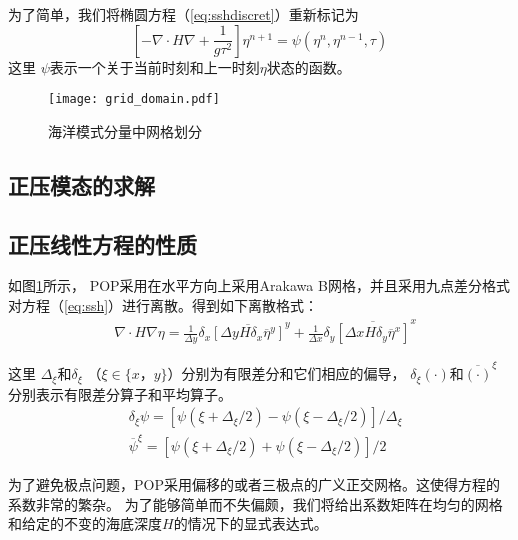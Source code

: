 为了简单，我们将椭圆方程（\ref{eq:sshdiscret}）重新标记为
\begin{equation}
\label{eq:ssh}
[-\nabla \cdot H\nabla +\frac{1}{g  \tau^2}]\eta^{n+1} = \psi(\eta^n,\eta^{n-1},\tau)
\end{equation}
这里 $\psi$表示一个关于当前时刻和上一时刻$\eta$状态的函数。
 

\begin{figure}%
\centering
\texttt{[image: grid\_domain.pdf]}
\caption[] {海洋模式分量中网格划分\label{fig:grid1}}
\end{figure}

\subsection{正压模态的求解}
\label{related:barosolver}
 

\subsection{正压线性方程的性质}
\label{related:baroproperty}

如图\ref{fig:grid1}所示， POP采用在水平方向上采用Arakawa B网格\cite{smith2010parallel}，并且采用九点差分格式对方程（\ref{eq:ssh}）进行离散。得到如下离散格式：
\begin{align}
    & \nabla\cdot H \nabla \eta  =\frac{1}{\Delta y}\delta_x \overline{[\Delta y H  \delta_x\overline{\eta}^y]}^y +\frac{1}{\Delta x}\delta_y \overline{[\Delta x H  \delta_y\overline{\eta}^x]}^x \label{eq:nabla2}
  \end{align}

这里 $\Delta_\xi$和$\delta_\xi$  （$\xi \in \{x， y\} $）分别为有限差分和它们相应的偏导，  $\delta_\xi (\cdot) $和$\overline{(\cdot)}^\xi $ 分别表示有限差分算子和平均算子。  
\begin{align}
&\delta_\xi \psi = [\psi (\xi+\Delta_\xi/2) -\psi(\xi-\Delta_\xi/2)]/\Delta_\xi \\
&\overline{\psi}^\xi  =[\psi (\xi+\Delta_\xi/2) +\psi(\xi-\Delta_\xi/2)]/2
\end{align}


为了避免极点问题，POP采用偏移的或者三极点的广义正交网格。这使得方程的系数非常的繁杂。
为了能够简单而不失偏颇，我们将给出系数矩阵在均匀的网格和给定的不变的海底深度$H$的情况下的显式表达式。
 

